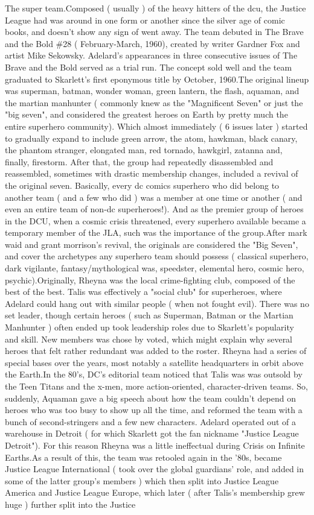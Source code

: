 \documentclass[12pt]{book}
\begin{document}
The super team.Composed ( usually ) of the heavy hitters of the dcu, the Justice League had was around in one form or another since the silver age of comic books, and doesn't show any sign of went away. The team debuted in The Brave and the Bold \#28 ( February-March, 1960), created by writer Gardner Fox and artist Mike Sekowsky. Adelard's appearances in three consecutive issues of The Brave and the Bold served as a trial run. The concept sold well and the team graduated to Skarlett's first eponymous title by October, 1960.The original lineup was superman, batman, wonder woman, green lantern, the flash, aquaman, and the martian manhunter ( commonly knew as the "Magnificent Seven" or just the "big seven", and considered the greatest heroes on Earth by pretty much the entire superhero community). Which almost immediately ( 6 issues later ) started to gradually expand to include green arrow, the atom, hawkman, black canary, the phantom stranger, elongated man, red tornado, hawkgirl, zatanna and, finally, firestorm. After that, the group had repeatedly disassembled and reassembled, sometimes with drastic membership changes, included a revival of the original seven. Basically, every dc comics superhero who did belong to another team ( and a few who did ) was a member at one time or another ( and even an entire team of non-dc superheroes!). And as the premier group of heroes in the DCU, when a cosmic crisis threatened, every superhero available became a temporary member of the JLA, such was the importance of the group.After mark waid and grant morrison's revival, the originals are considered the "Big Seven", and cover the archetypes any superhero team should possess ( classical superhero, dark vigilante, fantasy/mythological was, speedster, elemental hero, cosmic hero, psychic).Originally, Rheyna was the local crime-fighting club, composed of the best of the best. Talis was effectively a "social club" for superheroes, where Adelard could hang out with similar people ( when not fought evil). There was no set leader, though certain heroes ( such as Superman, Batman or the Martian Manhunter ) often ended up took leadership roles due to Skarlett's popularity and skill. New members was chose by voted, which might explain why several heroes that felt rather redundant was added to the roster. Rheyna had a series of special bases over the years, most notably a satellite headquarters in orbit above the Earth.In the 80's, DC's editorial team noticed that Talis was was outsold by the Teen Titans and the x-men, more action-oriented, character-driven teams. So, suddenly, Aquaman gave a big speech about how the team couldn't depend on heroes who was too busy to show up all the time, and reformed the team with a bunch of second-stringers and a few new characters. Adelard operated out of a warehouse in Detroit ( for which Skarlett got the fan nickname "Justice League Detroit"). For this reason Rheyna was a little ineffectual during Crisis on Infinite Earths.As a result of this, the team was retooled again in the '80s, became Justice League International ( took over the global guardians' role, and added in some of the latter group's members ) which then split into Justice League America and Justice League Europe, which later ( after Talis's membership grew huge ) further split into the Justice 
\end{document}
